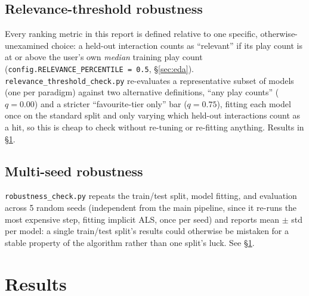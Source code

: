 \documentclass[11pt,a4paper]{article}
\newcommand{\code}[1]{\texttt{#1}}
\newcommand{\secref}[1]{\S\ref{#1}}
\begin{document}
\subsection{Relevance-threshold robustness}

Every ranking metric in this report is defined relative to one specific, otherwise-unexamined choice: a held-out interaction counts as ``relevant'' if its play count is at or above the user's own \emph{median} training play count (\code{config.RELEVANCE\_PERCENTILE = 0.5}, \secref{sec:eda}). \code{relevance\_threshold\_check.py} re-evaluates a representative subset of models (one per paradigm) against two alternative definitions, ``any play counts'' ($q=0.00$) and a stricter ``favourite-tier only'' bar ($q=0.75$), fitting each model once on the standard split and only varying which held-out interactions count as a hit, so this is cheap to check without re-tuning or re-fitting anything. Results in \secref{sec:results}.

\subsection{Multi-seed robustness}

\code{robustness\_check.py} repeats the train/test split, model fitting, and evaluation across 5 random seeds (independent from the main pipeline, since it re-runs the most expensive step, fitting implicit ALS, once per seed) and reports mean $\pm$ std per model: a single train/test split's results could otherwise be mistaken for a stable property of the algorithm rather than one split's luck. See \secref{sec:results}.

\section{Results}
\label{sec:results}
\end{document}
